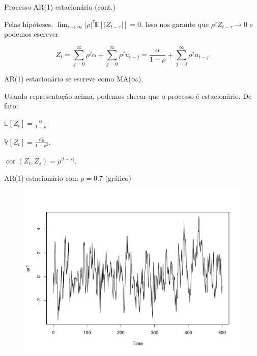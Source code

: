 \documentclass[11pt]{beamer}
\newenvironment{halfwideitemize}{\itemize\addtolength{\itemsep}{0.5em}}{\enditemize}
\newenvironment{halfwideenumerate}{\enumerate\addtolength{\itemsep}{0.5em}}{\endenumerate}
\begin{document}
\begin{frame}{Processo AR(1) estacionário (cont.)}
	\begin{halfwideitemize}
		\item Pelas hipóteses, $\lim_{\tau \to \infty} |\rho|^{\tau} \mathbb{E}[|Z_{t-\tau}|] = 0$. Isso nos garante que $\rho^{\tau} Z_{t-\tau} \to 0$ e podemos escrever
		
		$$Z_t = \sum_{j=0}^{\infty} \rho^{j} \alpha +   \sum_{j=0}^{\infty } \rho^{j} u_{t-j} = \frac{\alpha}{1-\rho} + \sum_{j=0}^\infty \rho^j u_{t-j}$$
		\item AR(1) estacionário se escreve como MA($\infty$).
		\item Usando representação acima, podemos checar que o processo é estacionário. De fato:
			\begin{halfwideenumerate}
			\item $\mathbb{E}[Z_t] = \frac{\alpha}{1-\rho}$
			\item $\mathbb{V}[Z_t] = \frac{\sigma^2_u}{1-\rho^2}$.
			\item $\operatorname{cor}(Z_t, Z_s) = \rho^{|t-s|}$.
		\end{halfwideenumerate}
	\end{halfwideitemize}
\end{frame}

\begin{frame}{AR(1) estacionário com $\rho = 0.7$ (gráfico)}
	\begin{figure}
		\includegraphics[scale=0.5]{graficos/ar1.pdf}
	\end{figure}
\end{frame}
\end{document}
